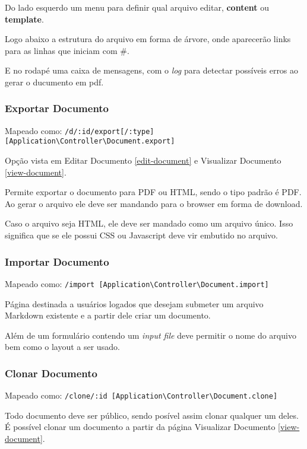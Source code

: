 Do lado esquerdo um menu para definir qual arquivo editar,
\textbf{content} ou \textbf{template}.

Logo abaixo a estrutura do arquivo em forma de árvore, onde aparecerão
links para as linhas que iniciam com \#.

E no rodapé uma caixa de mensagens, com o \emph{log} para detectar
possíveis erros ao gerar o ducumento em pdf.

\subsubsection{Exportar Documento}

Mapeado como:
\texttt{/d/:id/export{[}/:type{]} {[}Application\textbackslash{}Controller\textbackslash{}Document.export{]}}

Opção vista em Editar Documento \ref{edit-document} e Visualizar
Documento \ref{view-document}.

Permite exportar o documento para PDF ou HTML, sendo o tipo padrão é
PDF. Ao gerar o arquivo ele deve ser mandando para o browser em forma de
download.

Caso o arquivo seja HTML, ele deve ser mandado como um arquivo único.
Isso significa que se ele possui CSS ou Javascript deve vir embutido no
arquivo.

\subsubsection{Importar Documento}

Mapeado como:
\texttt{/import {[}Application\textbackslash{}Controller\textbackslash{}Document.import{]}}

Página destinada a usuários logados que desejam submeter um arquivo
Markdown existente e a partir dele criar um documento.

Além de um formulário contendo um \emph{input file} deve permitir o nome
do arquivo bem como o layout a ser usado.

\subsubsection{Clonar Documento}

Mapeado como:
\texttt{/clone/:id {[}Application\textbackslash{}Controller\textbackslash{}Document.clone{]}}

Todo documento deve ser público, sendo posível assim clonar qualquer um
deles. É possível clonar um documento a partir da página Visualizar
Documento \ref{view-document}.

